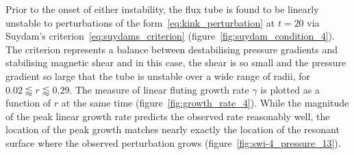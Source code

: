Prior to the onset of either instability, the flux tube is found to be linearly unstable to perturbations of the form~\eqref{eq:kink_perturbation} at $t=20$ via Suydam's criterion~\eqref{eq:suydams_criterion} (figure~\ref{fig:suydam_condition_4}). The criterion represents a balance between destabilising pressure gradients and stabilising magnetic shear and in this case, the shear is so small and the pressure gradient so large that the tube is unstable over a wide range of radii, for $ 0.02 \lessapprox r \lessapprox 0.29$. The measure of linear fluting growth rate $\gamma$ is plotted as a function of $r$ at the same time (figure~\ref{fig:growth_rate_4}). While the magnitude of the peak linear growth rate predicts the observed rate reasonably well, the location of the peak growth matches nearly exactly the location of the resonant surface where the observed perturbation grows (figure~\ref{fig:swi-4_pressure_13}).

